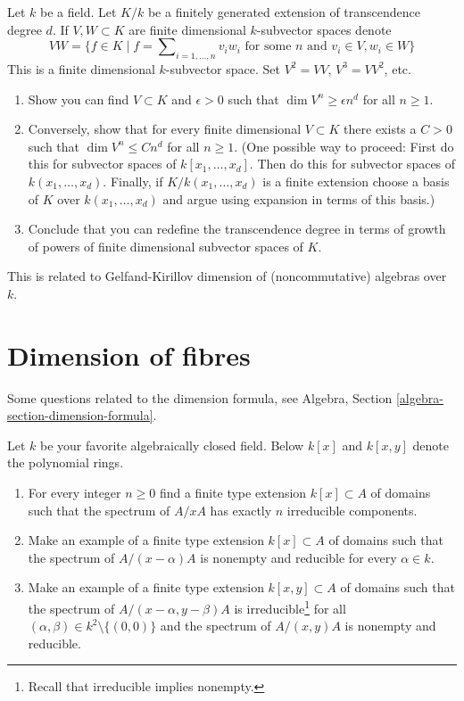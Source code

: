 \begin{exercise}
\label{exercise-growth-powers-subvector-space}
Let $k$ be a field. Let $K/k$ be a finitely generated extension
of transcendence degree $d$.
If $V, W \subset K$ are finite dimensional $k$-subvector spaces
denote
$$
VW = \{f \in K \mid f = \sum\nolimits_{i = 1, \ldots, n} v_i w_i
\text{ for some }n\text{ and }v_i \in V, w_i \in W\}
$$
This is a finite dimensional $k$-subvector space.
Set $V^2 = VV$, $V^3 = V V^2$, etc.
\begin{enumerate}
\item Show you can find $V \subset K$ and $\epsilon > 0$ such that
$\dim V^n \geq \epsilon n^d$ for all $n \geq 1$.
\item Conversely, show that for every finite dimensional $V \subset K$
there exists a $C > 0$ such that $\dim V^n \leq C n^d$ for all $n \geq 1$.
(One possible way to proceed:
First do this for subvector spaces of $k[x_1, \ldots, x_d]$.
Then do this for subvector spaces of $k(x_1, \ldots, x_d)$.
Finally, if $K/k(x_1, \ldots, x_d)$ is a finite extension
choose a basis of $K$ over $k(x_1, \ldots, x_d)$ and
argue using expansion in terms of this basis.)
\item Conclude that you can redefine the transcendence degree in terms
of growth of powers of finite dimensional subvector spaces of $K$.
\end{enumerate}
This is related to Gelfand-Kirillov dimension of (noncommutative)
algebras over $k$.
\end{exercise}








\section{Dimension of fibres}
\label{section-dimension-fibres}

\noindent
Some questions related to the dimension formula, see
Algebra, Section \ref{algebra-section-dimension-formula}.

\begin{exercise}
\label{exercise-nr-components-fibre}
Let $k$ be your favorite algebraically closed field.
Below $k[x]$ and $k[x, y]$ denote the polynomial rings.
\begin{enumerate}
\item For every integer $n \geq 0$ find a finite type extension
$k[x] \subset A$ of domains such that the spectrum of $A/xA$
has exactly $n$ irreducible components.
\item Make an example of a finite type extension $k[x] \subset A$
of domains such that the spectrum of $A/(x - \alpha)A$
is nonempty and reducible for every $\alpha \in k$.
\item Make an example of a finite type extension $k[x, y] \subset A$
of domains such that the spectrum of $A/(x - \alpha, y - \beta)A$
is irreducible\footnote{Recall that irreducible implies nonempty.}
for all $(\alpha, \beta) \in k^2 \setminus \{(0, 0)\}$
and the spectrum of $A/(x, y)A$ is nonempty and reducible.
\end{enumerate}
\end{exercise}

